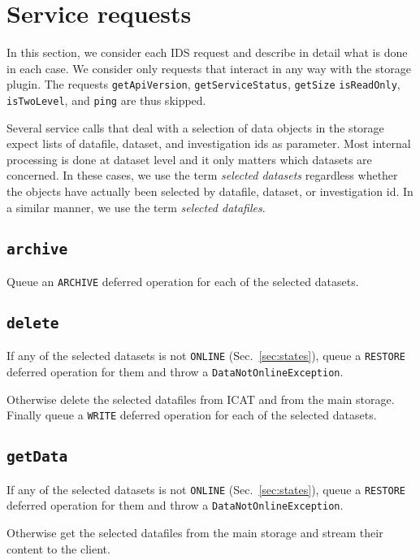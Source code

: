 \documentclass[paper=a4]{scrartcl}
\begin{document}
\section{Service requests}
\label{sec:requests}

In this section, we consider each IDS request and describe in detail
what is done in each case.  We consider only requests that interact in
any way with the storage plugin.  The requests \texttt{getApiVersion},
\texttt{getServiceStatus}, \texttt{getSize} \texttt{isReadOnly},
\texttt{isTwoLevel}, and \texttt{ping} are thus skipped.

Several service calls that deal with a selection of data objects in
the storage expect lists of datafile, dataset, and investigation ids
as parameter.  Most internal processing is done at dataset level and
it only matters which datasets are concerned.  In these cases, we use
the term \emph{selected datasets} regardless whether the objects have
actually been selected by datafile, dataset, or investigation id.  In
a similar manner, we use the term \emph{selected datafiles}.

\subsection{\texttt{archive}}

Queue an \texttt{ARCHIVE} deferred operation for each of the selected
datasets.

\subsection{\texttt{delete}}

If any of the selected datasets is not \texttt{ONLINE}
(Sec.\ \ref{sec:states}), queue a \texttt{RESTORE} deferred operation
for them and throw a \texttt{DataNotOnlineException}.

Otherwise delete the selected datafiles from ICAT and from the main
storage.  Finally queue a \texttt{WRITE} deferred operation for each
of the selected datasets.

\subsection{\texttt{getData}}

If any of the selected datasets is not \texttt{ONLINE}
(Sec.\ \ref{sec:states}), queue a \texttt{RESTORE} deferred operation
for them and throw a \texttt{DataNotOnlineException}.

Otherwise get the selected datafiles from the main storage and stream
their content to the client.
\end{document}
